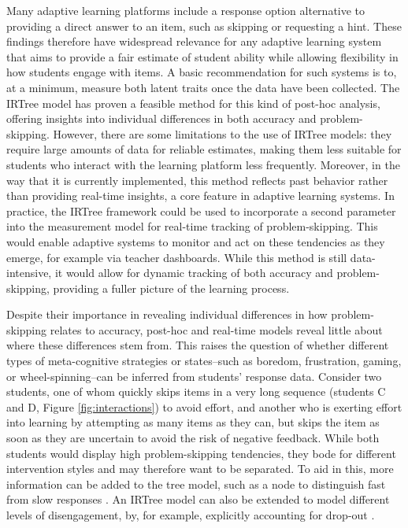 \documentclass{edm_article}
\begin{document}
Many adaptive learning platforms include a response option alternative to providing a direct answer to an item, such as skipping or requesting a hint. These findings therefore have widespread relevance for any adaptive learning system that aims to provide a fair estimate of student ability while allowing flexibility in how students engage with items. A basic recommendation for such systems is to, at a minimum, measure both latent traits once the data have been collected. The IRTree model has proven a feasible method for this kind of post-hoc analysis, offering insights into individual differences in both accuracy and problem-skipping. However, there are some limitations to the use of IRTree models: they require large amounts of data for reliable estimates, making them less suitable for students who interact with the learning platform less frequently. Moreover, in the way that it is currently implemented, this method reflects past behavior rather than providing real-time insights, a core feature in adaptive learning systems. In practice, the IRTree framework could be used to incorporate a second parameter into the measurement model for real-time tracking of problem-skipping. This would enable adaptive systems to monitor and act on these tendencies as they emerge, for example via teacher dashboards. While this method is still data-intensive, it would allow for dynamic tracking of both accuracy and problem-skipping, providing a fuller picture of the learning process. 

Despite their importance in revealing individual differences in how problem-skipping relates to accuracy, post-hoc and real-time models reveal little about where these differences stem from. This raises the question of whether different types of meta-cognitive strategies or states--such as boredom, frustration, gaming, or wheel-spinning--can be inferred from students' response data. Consider two students, one of whom quickly skips items in a very long sequence (students C and D, Figure \ref{fig:interactions}) to avoid effort, and another who is exerting effort into learning by attempting as many items as they can, but skips the item as soon as they are uncertain to avoid the risk of negative feedback. While both students would display high problem-skipping tendencies, they bode for different intervention styles and may therefore want to be separated. To aid in this, more information can be added to the tree model, such as a node to distinguish fast from slow responses \cite{coomans2016distinguishing, hofman2018fast}. An IRTree model can also be extended to model different levels of disengagement, by, for example, explicitly accounting for drop-out \cite{huang2020mixture}. 
\end{document}
